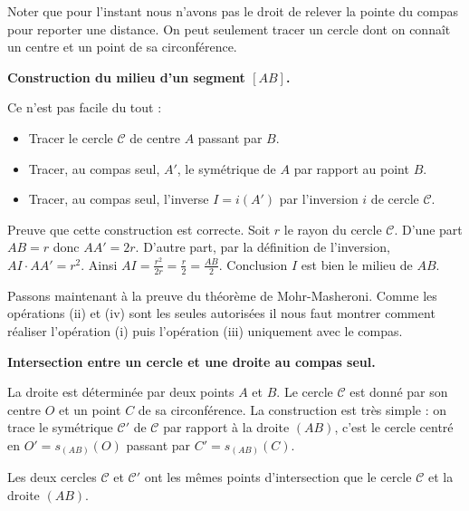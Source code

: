 \documentclass[11pt,class=report,crop=false]{standalone}
\newcommand{\inversion}{i}
\begin{document}

\begin{remarque*}
Noter que pour l'instant nous n'avons pas le droit de relever la pointe du compas pour reporter une distance.
On peut seulement tracer un cercle dont on connaît un centre et un point de sa circonférence.
\end{remarque*}

\bigskip
\textbf{Construction du milieu d'un segment $[AB]$.}

Ce n'est pas facile du tout :
\begin{itemize}
  \item Tracer le cercle $\mathcal{C}$ de centre $A$ passant par $B$.
  \item Tracer, au compas seul, $A'$, le symétrique de $A$ par rapport au point $B$.
  \item Tracer, au compas seul, l'inverse $I = \inversion(A')$ par l'inversion $\inversion$ de cercle $\mathcal{C}$.
\end{itemize}


Preuve que cette construction est correcte. 
Soit $r$ le rayon du cercle $\mathcal{C}$. 
D'une part $AB=r$ donc $AA' = 2r$.
D'autre part, par la définition de l'inversion, $AI \cdot AA' = r^2$. 
Ainsi $AI = \frac{r^2}{2r} = \frac{r}{2} = \frac{AB}{2}$.
Conclusion $I$ est bien le milieu de $AB$.


\bigskip
\bigskip

Passons maintenant à la preuve du théorème de Mohr-Masheroni.
Comme les opérations (ii) et (iv) sont les seules autorisées il nous faut montrer comment réaliser 
l'opération (i) puis l'opération (iii) uniquement avec le compas.

\textbf{Intersection entre un cercle et une droite au compas seul.}

La droite est déterminée par deux points $A$ et $B$.
Le cercle $\mathcal{C}$ est donné par son centre $O$ et un point $C$ de sa circonférence.
La construction est très simple : on trace le symétrique $\mathcal{C'}$ de $\mathcal{C}$
par rapport à la droite $(AB)$, c'est le cercle centré en $O'=s_{(AB)}(O)$ passant par 
$C'=s_{(AB)}(C)$.

Les deux cercles $\mathcal{C}$ et $\mathcal{C'}$ ont les mêmes points d'intersection
que le cercle $\mathcal{C}$ et la droite $(AB)$.

\end{document}
